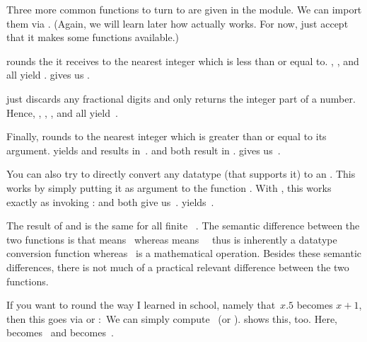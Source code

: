 Three more common functions to turn  to  are given in the  module.
We can import them via .
(Again, we will learn later how  actually works.
For now, just accept that it makes some functions available.)

 rounds the  it receives to the nearest integer which is less than or equal to.
, , and  all yield .
 gives us .

 just discards any fractional digits and only returns the integer part of a number.
Hence, , , , and  all yield~.

Finally,  rounds to the nearest integer which is greater than or equal to its argument.
 yields  and  results in~.
 and  both result in .
 gives us~.

You can also try to directly convert any datatype (that supports it) to an .
This works by simply putting it as argument to the function .
With , this works exactly as invoking :
 and  both give us~.
 yields~.

The result of  and  is the same for all finite ~.
The semantic difference between the two functions is that  means~\emph{} whereas  means~\emph{}
~thus is inherently a datatype conversion function whereas ~is a mathematical operation.
Besides these semantic differences, there is not much of a practical relevant difference between the two functions.

If you want to round the way I learned in school, namely that~$x.5$ becomes $x + 1$, then this goes via  or :~We can simply compute~ (or ).
 shows this, too.
Here,  becomes~ and  becomes~.

